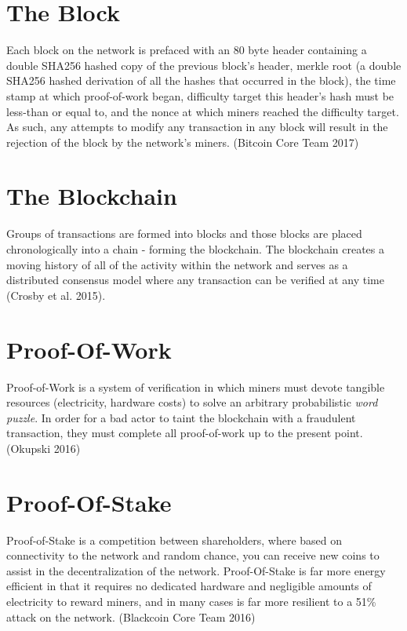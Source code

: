 \documentclass[11pt,a4paperpaper,]{report}
\begin{document}
\section{The Block}\label{the-block}

Each block on the network is prefaced with an 80 byte header containing
a double SHA256 hashed copy of the previous block's header, merkle root
(a double SHA256 hashed derivation of all the hashes that occurred in
the block), the time stamp at which proof-of-work began, difficulty
target this header's hash must be less-than or equal to, and the nonce
at which miners reached the difficulty target. As such, any attempts to
modify any transaction in any block will result in the rejection of the
block by the network's miners. (Bitcoin Core Team 2017)

\section{The Blockchain}\label{the-blockchain}

Groups of transactions are formed into blocks and those blocks are
placed chronologically into a chain - forming the blockchain. The
blockchain creates a moving history of all of the activity within the
network and serves as a distributed consensus model where any
transaction can be verified at any time (Crosby et al. 2015).

\section{Proof-Of-Work}\label{proof-of-work}

Proof-of-Work is a system of verification in which miners must devote
tangible resources (electricity, hardware costs) to solve an arbitrary
probabilistic \textit{word puzzle}. In order for a bad actor to taint
the blockchain with a fraudulent transaction, they must complete all
proof-of-work up to the present point. (Okupski 2016)

\section{Proof-Of-Stake}\label{proof-of-stake}

Proof-of-Stake is a competition between shareholders, where based on
connectivity to the network and random chance, you can receive new coins
to assist in the decentralization of the network. Proof-Of-Stake is far
more energy efficient in that it requires no dedicated hardware and
negligible amounts of electricity to reward miners, and in many cases is
far more resilient to a 51\% attack on the network. (Blackcoin Core Team
2016)
\end{document}
